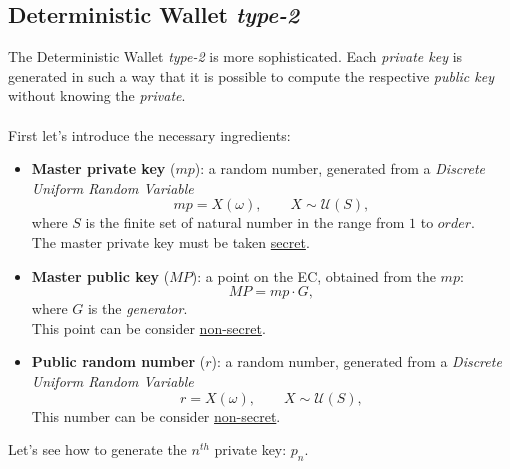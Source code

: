 \subsection{Deterministic Wallet \textit{type-2}}
The Deterministic Wallet \textit{type-2} is more sophisticated. Each \textit{private key} is generated in such a way that it is possible to compute the respective \textit{public key} without knowing the \textit{private}.
\\ \\
First let's introduce the necessary ingredients:
\begin{itemize}[label=$\diamond$]
	\item \textbf{Master private key} ($mp$): a random number, generated from a \textit{Discrete Uniform Random Variable}
	\begin{equation*}
	mp=X(\omega), \qquad X\sim \mathcal{U}(S),
	\end{equation*}
	where $S$ is the finite set of natural number in the range from $1$ to $order$. \\ The master private key must be taken \underline{secret}.
	\item \textbf{Master public key} ($MP$): a point on the EC, obtained from the $mp$:
	\begin{equation*}
	MP=mp\cdot G,
	\end{equation*}
	where $G$ is the \textit{generator}.\\ This point can be consider \underline{non-secret}.
	\item \textbf{Public random number} ($r$): a random number, generated from a \textit{Discrete Uniform Random Variable}
	\begin{equation*}
	r=X(\omega), \qquad X\sim \mathcal{U}(S),
	\end{equation*}
	This number can be consider \underline{non-secret}.
\end{itemize}
Let's see how to generate the $n^{th}$ private key: $p_n$.

